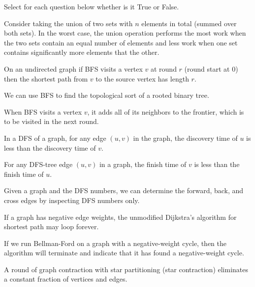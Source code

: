 \begin{problem}

Select for each question below whether is it True or False.


\asktf 

Consider taking the union of two sets with $n$ elements in total
(summed over both sets).  In the worst case, the union operation
performs the most work when the two sets contain an equal number of
elements and less work when one set contains significantly more
elements that the other.

\solt

\asktf

On an undirected graph if  BFS visits a vertex $v$ at round $r$ (round
start at $0$) then the shortest path from $v$ to the source vertex has
length $r$.

\solt

\asktf
We can use BFS to find the topological sort of a rooted binary tree.

\solt

\asktf

When BFS visits a vertex $v$, it adds all of its neighbors to the
frontier, which is to be visited in the next round.

\solf


\asktf 

In a DFS of a graph, for any edge $(u,v)$ in the graph, the discovery
time of $u$ is less than the discovery time of $v$.  

\solf


\asktf 
For any DFS-tree edge $(u,v)$ in a graph, the finish time of $v$ is
less than the finish time of $u$.  
\solt

\asktf 
Given a graph and the DFS numbers, we can determine the
forward, back, and cross edges by inspecting DFS numbers only.  
\solt

\asktf

If a graph has negative edge weights, the unmodified Dijkstra's
algorithm for shortest path may loop forever.

\solf

\asktf

If we run Bellman-Ford on a graph with a negative-weight cycle, then
the algorithm will terminate and indicate that it has found a
negative-weight cycle.

\solf


\asktf 

A round of graph contraction with star partitioning (star contraction)
eliminates a constant fraction of vertices and edges.

\solf


\end{problem}

